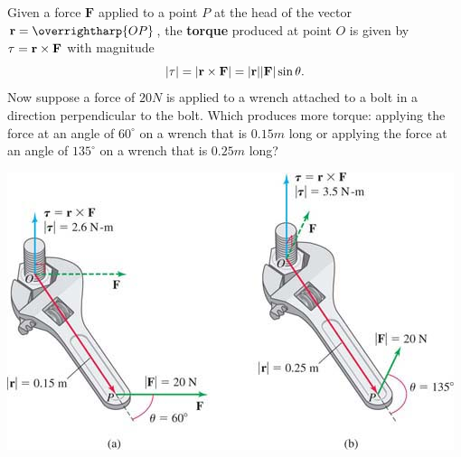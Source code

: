 \documentclass[../mathNotesPreamble]{subfiles}
\begin{document}
    \begin{ex*}
      Given a force $\mathbf F$ applied to a point $P$ at the head of the vector $\vecr=\overrightharp{OP}$, the \textbf{torque} produced at point $O$ is given by $\mathbf \tau={\mathbf{r}}\times\mathbf F$ with magnitude
        \[{\left\vert\mathbf \tau\right\vert}={\left\vert{\mathbf{r}}\times\mathbf F\right\vert}={\left\vert{\mathbf{r}}\right\vert}{\left\vert\mathbf F\right\vert}\sin\theta.\]
      Now suppose a force of $20 N$ is applied to a wrench attached to a bolt in a direction perpendicular to the bolt. Which produces more torque: applying the force at an angle of $60^\circ$ on a wrench that is $0.15 m$ long or applying the force at an angle of $135^\circ$ on a wrench that is $0.25 m$ long? 
    \end{ex*}
    \begin{center}
      \includegraphics[width=0.75\linewidth]{../images/briggs_13_04/fig13_63}
    \end{center}

  \pagebreak
  
\end{document}
